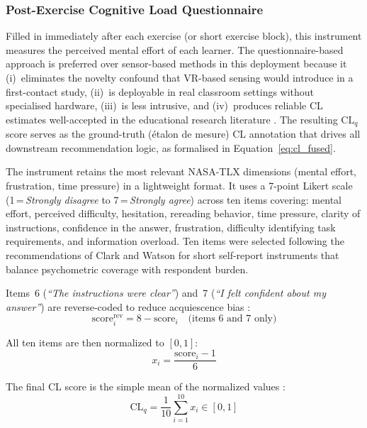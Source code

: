 \documentclass[ASNA,twocolumn]{USG} %
\begin{document}
\subsubsection{Post-Exercise Cognitive Load Questionnaire}

Filled in immediately after each exercise (or short exercise block),
this instrument measures the perceived mental effort of each learner.
The questionnaire-based approach is preferred over sensor-based
methods in this deployment because it (i)~eliminates the novelty
confound that VR-based sensing would introduce in a first-contact
study, (ii)~is deployable in real classroom settings without
specialised hardware, (iii)~is less intrusive, and (iv)~produces
reliable CL estimates well-accepted in the educational research
literature \cite{Paas1992,Hart1988}.
The resulting $\text{CL}_q$ score serves as the ground-truth
(étalon de mesure) CL annotation that drives all downstream
recommendation logic, as formalised in
Equation~\eqref{eq:cl_fused}.

The instrument retains the most relevant NASA-TLX dimensions (mental
effort, frustration, time pressure) in a lightweight format.
It uses a 7-point Likert scale (1\,=\,\emph{Strongly disagree} to
7\,=\,\emph{Strongly agree}) across ten items covering: mental
effort, perceived difficulty, hesitation, rereading behavior, time
pressure, clarity of instructions, confidence in the answer,
frustration, difficulty identifying task requirements, and information
overload. Ten items were selected following the recommendations of
Clark and Watson \cite{Clark1995} for short self-report instruments
that balance psychometric coverage with respondent burden.

Items~6 (\emph{``The instructions were clear''}) and~7
(\emph{``I felt confident about my answer''}) are reverse-coded to
reduce acquiescence bias \cite{Podsakoff2003}:
\begin{equation}
\text{score}_{i}^{\text{rev}} = 8 - \text{score}_i
\quad \text{(items 6 and 7 only)}
\end{equation}

All ten items are then normalized to $[0,1]$:
\begin{equation}
x_i = \frac{\text{score}_i - 1}{6}
\end{equation}

The final CL score is the simple mean of the normalized values
\cite{Paas2003}:
\begin{equation}
\text{CL}_q = \frac{1}{10}\sum_{i=1}^{10} x_i \in [0,1]
\end{equation}
\end{document}

